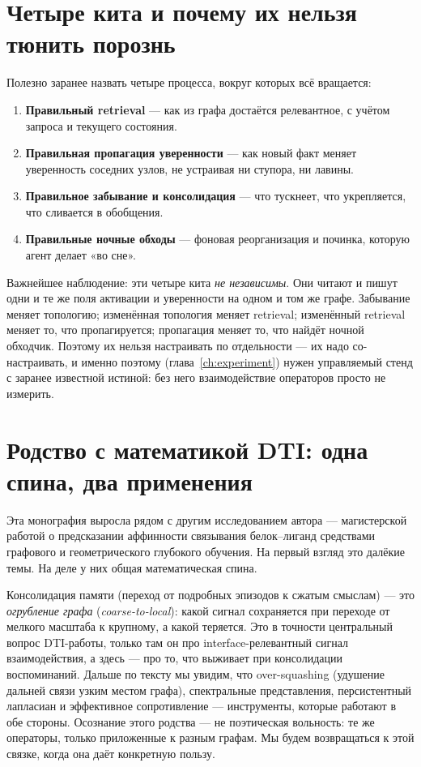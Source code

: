 \section{Четыре кита и почему их нельзя тюнить порознь}

Полезно заранее назвать четыре процесса, вокруг которых всё вращается:

\begin{enumerate}
\item \textbf{Правильный retrieval} — как из графа достаётся релевантное, с
учётом запроса и текущего состояния.
\item \textbf{Правильная пропагация уверенности} — как новый факт меняет
уверенность соседних узлов, не устраивая ни ступора, ни лавины.
\item \textbf{Правильное забывание и консолидация} — что тускнеет, что
укрепляется, что сливается в обобщения.
\item \textbf{Правильные ночные обходы} — фоновая реорганизация и починка,
которую агент делает «во сне».
\end{enumerate}

Важнейшее наблюдение: эти четыре кита \emph{не независимы}. Они читают и пишут
одни и те же поля активации и уверенности на одном и том же графе. Забывание
меняет топологию; изменённая топология меняет retrieval; изменённый retrieval
меняет то, что пропагируется; пропагация меняет то, что найдёт ночной обходчик.
Поэтому их нельзя настраивать по отдельности — их надо со-настраивать, и именно
поэтому (глава~\ref{ch:experiment}) нужен управляемый стенд с заранее известной
истиной: без него взаимодействие операторов просто не измерить.

\section{Родство с математикой DTI: одна спина, два применения}

Эта монография выросла рядом с другим исследованием автора — магистерской
работой о предсказании аффинности связывания белок–лиганд средствами
графового и геометрического глубокого обучения. На первый взгляд это далёкие
темы. На деле у них общая математическая спина.

Консолидация памяти (переход от подробных эпизодов к сжатым смыслам) — это
\emph{огрубление графа} (\textit{coarse-to-local}): какой сигнал сохраняется при
переходе от мелкого масштаба к крупному, а какой теряется. Это в точности
центральный вопрос DTI-работы, только там он про interface-релевантный сигнал
взаимодействия, а здесь — про то, что выживает при консолидации воспоминаний.
Дальше по тексту мы увидим, что over-squashing (удушение дальней связи узким
местом графа), спектральные представления, персистентный лапласиан и
эффективное сопротивление — инструменты, которые работают в обе стороны.
Осознание этого родства — не поэтическая вольность: те же операторы, только
приложенные к разным графам. Мы будем возвращаться к этой связке, когда она
даёт конкретную пользу.


